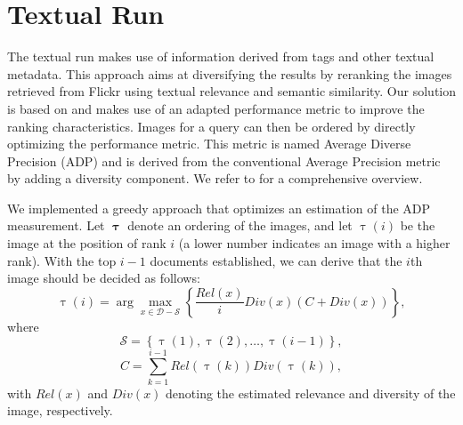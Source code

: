 \documentclass{acm_proc_article-me11_tweaked}
\begin{document}
\section{Textual Run}
The textual run makes use of information derived from tags and other textual metadata.
This approach aims at diversifying the results by reranking the images retrieved from Flickr using textual relevance and semantic similarity.
Our solution is based on \cite{textual-diversification} and makes use of an adapted performance metric to improve the ranking characteristics.
Images for a query can then be ordered by directly optimizing the performance metric.
This metric is named Average Diverse Precision (ADP) and is derived from the conventional Average Precision metric by adding a diversity component.
We refer to \cite{textual-diversification} for a comprehensive overview.

We implemented a greedy approach that optimizes an estimation of the ADP measurement. 
Let $\pmb\uptau$ denote an ordering of the images, and let $\uptau(i)$ be the image at the position of rank $i$ (a lower number indicates an image with a higher rank).
With the top $ i - 1 $ documents established, we can derive that the $i$th image should be decided as follows:
\begin{equation}
 \displaystyle
  \uptau(i) = \arg\max_{x \in \mathscr{D} - \mathscr{S} } \left\{ \frac{Rel(x)}{i} Div(x) ( C + Div(x) )\right\},
\end{equation}
where
\begin{equation}
\mathscr{S} = \left\{\uptau(1), \uptau(2), \ldots , \uptau(i - 1)\right\} ,
\end{equation}
\begin{equation}
C = \sum^{i-1}_{k=1} Rel(\uptau(k)) Div(\uptau(k)),
\end{equation}
with $Rel(x)$ and $Div(x)$ denoting the estimated relevance and diversity of the image, respectively.

%
\end{document}
